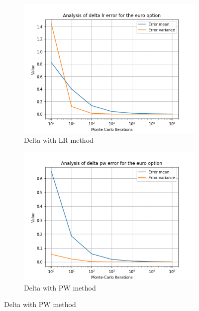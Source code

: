 \documentclass[11pt,a4paper,fleqn,draft]{article}
\begin{document}
\begin{figure}
  \centering
      \begin{subfigure}[b]{0.45\textwidth}
          \includegraphics[width=\textwidth]{graphs/eurodeltalr.png}
          \caption{Delta with LR method}
      \end{subfigure}
      \begin{subfigure}[b]{0.45\textwidth}
          \includegraphics[width=\textwidth]{graphs/eurodeltapw.png}
          \caption{Delta with PW method}
      \end{subfigure}


\end{figure}
\end{document}
